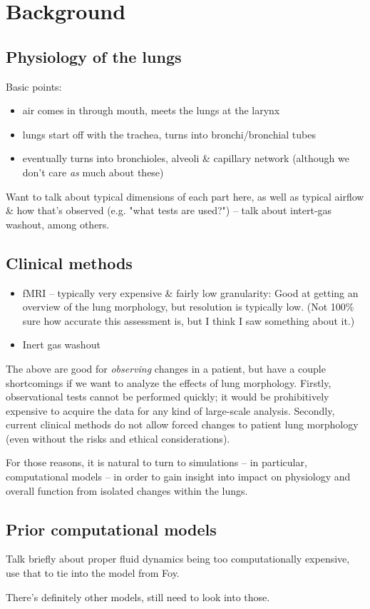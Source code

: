 %
\section{Background}

\subsection{Physiology of the lungs}

Basic points:
\begin{itemize}
    \item air comes in through mouth, meets the lungs at the larynx
    \item lungs start off with the trachea, turns into bronchi/bronchial tubes
    \item eventually turns into bronchioles, alveoli \& capillary network (although we don't care
        \textit{as} much about these)
\end{itemize}

Want to talk about typical dimensions of each part here, as well as typical airflow \& how that's
observed (e.g. "what tests are used?") -- talk about intert-gas washout, among others.

\subsection{Clinical methods}

\begin{itemize}
    \item fMRI -- typically very expensive \& fairly low granularity: Good at getting an overview of
        the lung morphology, but resolution is typically low. (Not 100\% sure how accurate this
        assessment is, but I think I saw something about it.)
    \item Inert gas washout
\end{itemize}

The above are good for \textit{observing} changes in a patient, but have a couple shortcomings if we
want to analyze the effects of lung morphology. Firstly, observational tests cannot be performed
quickly; it would be prohibitively expensive to acquire the data for any kind of large-scale
analysis. Secondly, current clinical methods do not allow forced changes to patient lung morphology
(even without the risks and ethical considerations).

For those reasons, it is natural to turn to simulations -- in particular, computational models -- in
order to gain insight into impact on physiology and overall function from isolated changes within
the lungs.

\subsection{Prior computational models}

Talk briefly about proper fluid dynamics being too computationally expensive, use that to tie into
the model from Foy.

There's definitely other models, still need to look into those.
